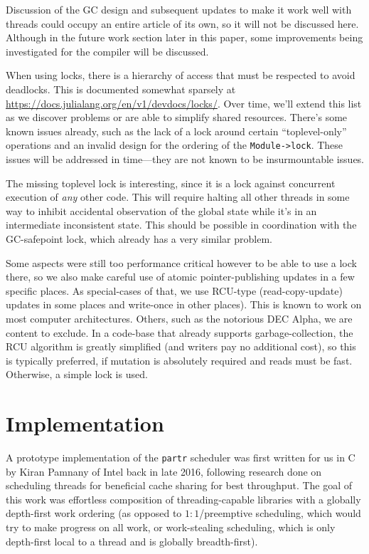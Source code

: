 \documentclass{juliacon}
\begin{document}
Discussion of the GC design and subsequent updates to make it work well with threads could occupy an entire article of its own, so it will not be discussed here. Although in the future work section later in this paper, some improvements being investigated for the compiler will be discussed.

When using locks, there is a hierarchy of access that must be respected to avoid deadlocks. This is documented somewhat sparsely at \url{https://docs.julialang.org/en/v1/devdocs/locks/}. Over time, we'll extend this list as we discover problems or are able to simplify shared resources. There's some known issues already, such as the lack of a lock around certain ``toplevel-only'' operations and an invalid design for the ordering of the \verb|Module->lock|. These issues will be addressed in time—they are not known to be insurmountable issues.

The missing toplevel lock is interesting, since it is a lock against concurrent execution of \textit{any} other code. This will require halting all other threads in some way to inhibit accidental observation of the global state while it's in an intermediate inconsistent state. This should be possible in coordination with the GC-safepoint lock, which already has a very similar problem.

Some aspects were still too performance critical however to be able to use a lock there, so we also make careful use of atomic pointer-publishing updates in a few specific places. As special-cases of that, we use RCU-type (read-copy-update) updates in some places and write-once in other places). This is known to work on most computer architectures. Others, such as the notorious DEC Alpha, we are content to exclude. In a code-base that already supports garbage-collection, the RCU algorithm is greatly simplified (and writers pay no additional cost), so this is typically preferred, if mutation is absolutely required and reads must be fast. Otherwise, a simple lock is used.

\section{Implementation}
\label{subsub:implementation}

A prototype implementation of the \verb|partr| scheduler was first written for us in C by Kiran Pamnany of Intel back in late 2016, following research done on scheduling threads for beneficial cache sharing for best throughput\cite{Chen:2007:STC:1248377.1248396}. The goal of this work was effortless composition of threading-capable libraries with a globally depth-first work ordering (as opposed to $1 \mathbin{:} 1$/preemptive scheduling, which would try to make progress on all work, or work-stealing scheduling, which is only depth-first local to a thread and is globally breadth-first).
\end{document}

